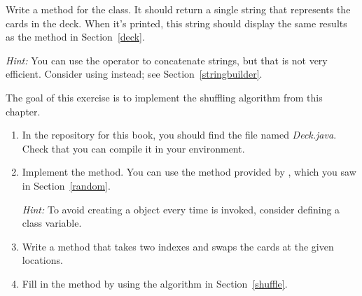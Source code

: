 \begin{exercise}  %

Write a  method for the  class.
It should return a single string that represents the cards in the deck.
When it's printed, this string should display the same results as the  method in Section~\ref{deck}.


{\em Hint:} You can use the \java{+} operator to concatenate strings, but that is not very efficient.
Consider using  instead; see Section~\ref{stringbuilder}.

\end{exercise}


\begin{exercise}  %
\label{ex.shuffle}

The goal of this exercise is to implement the shuffling algorithm from this chapter.

\begin{enumerate}

\item In the repository for this book, you should find the file named {\it Deck.java}.
Check that you can compile it in your environment.

\item Implement the  method.
You can use the  method provided by , which you saw in Section~\ref{random}.

{\em Hint:} To avoid creating a  object every time  is invoked, consider defining a class variable.

\item Write a  method that takes two indexes and swaps the cards at the given locations.

\item Fill in the  method by using the algorithm in Section~\ref{shuffle}.

\end{enumerate}

\end{exercise}


